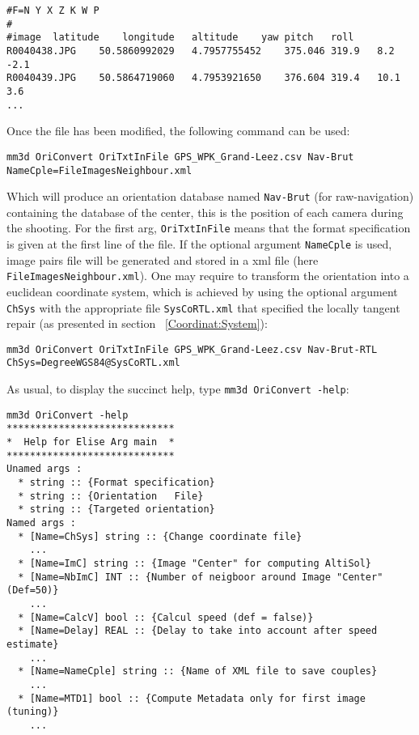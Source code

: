 \begin{verbatim}
#F=N Y X Z K W P
#
#image	latitude	longitude	altitude	yaw	pitch	roll
R0040438.JPG	50.5860992029	4.7957755452	375.046	319.9	8.2	-2.1
R0040439.JPG	50.5864719060	4.7953921650	376.604	319.4	10.1	3.6
...
\end{verbatim}

Once the file has been modified, the following command can be used:

\begin{verbatim}
mm3d OriConvert OriTxtInFile GPS_WPK_Grand-Leez.csv Nav-Brut NameCple=FileImagesNeighbour.xml
\end{verbatim}

Which will produce an orientation database named {\tt Nav-Brut} (for raw-navigation) containing the database of the center, this is the position of each camera during the shooting. For the first arg, {\tt OriTxtInFile} means that the format specification is given at the first line of the file. If the optional argument {\tt NameCple} is used, image pairs file will be generated and stored in a xml file (here {\tt FileImagesNeighbour.xml}).
One may require to transform the orientation into a euclidean coordinate system, which is achieved by using the optional argument {\tt ChSys} with the appropriate file {\tt SysCoRTL.xml} that specified the locally tangent repair (as presented in section ~\ref{Coordinat:System}):

\begin{verbatim}
mm3d OriConvert OriTxtInFile GPS_WPK_Grand-Leez.csv Nav-Brut-RTL ChSys=DegreeWGS84@SysCoRTL.xml 
\end{verbatim}

As usual, to display the succinct help, type {\tt mm3d OriConvert -help}:

\begin{verbatim}
mm3d OriConvert -help
*****************************
*  Help for Elise Arg main  *
*****************************
Unamed args : 
  * string :: {Format specification}
  * string :: {Orientation   File}
  * string :: {Targeted orientation}
Named args : 
  * [Name=ChSys] string :: {Change coordinate file}
	...
  * [Name=ImC] string :: {Image "Center" for computing AltiSol}
  * [Name=NbImC] INT :: {Number of neigboor around Image "Center" (Def=50)}
 	...
  * [Name=CalcV] bool :: {Calcul speed (def = false)}
  * [Name=Delay] REAL :: {Delay to take into account after speed estimate}
	...
  * [Name=NameCple] string :: {Name of XML file to save couples}
	...
  * [Name=MTD1] bool :: {Compute Metadata only for first image (tuning)}
	...
\end{verbatim}

